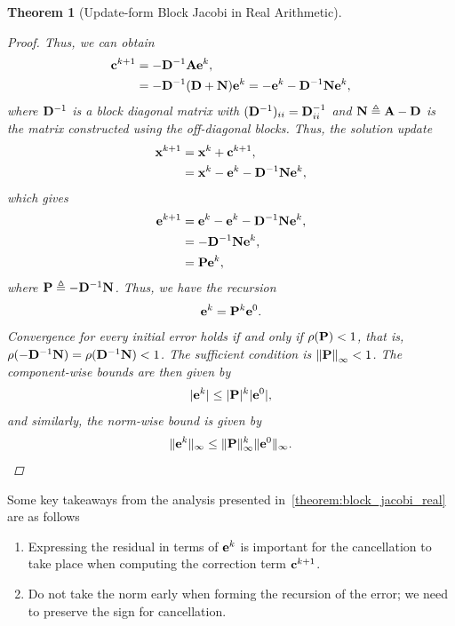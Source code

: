 \documentclass[11pt,draft]{article}
\newcommand{\define}{\ensuremath{\triangleq}}
\newcommand{\vect}[1]{\mathbf{\MakeLowercase{#1}}}
\newcommand{\mat}[1]{\mathbf{\MakeUppercase{#1}}}
\newcommand{\norm}[2][]{\left\|#2\right\|_{#1}}
\newtheorem{theorem}{Theorem}[section]
\theoremstyle{definition}
\theoremstyle{remark}
\begin{document}
\begin{theorem}[Update-form Block Jacobi in Real Arithmetic]
\begin{proof}
      Thus, we can obtain
      \begin{align}
          \vect{c}^{k+1} &= -\mat{D}^{-1}\mat{a}\vect{e}^{k},\\
          &= - \mat{D}^{-1}(\mat{d} + \mat{n})\vect{e}^{k} = - \vect{e}^k- \mat{d}^{-1}\mat{n}\vect{e}^k,
      \end{align}
      where $\mat{d}^{-1}$ is a block diagonal matrix with $(\mat{d}^{-1})_{ii} = \mat{d}_{ii}^{-1}$ and $\mat{n}\define \mat{a} - \mat{d}$ is the matrix constructed using the off-diagonal blocks.
      Thus, the solution update 
      \begin{align}
          \vect{x}^{k+1} &= \vect{x}^{k} + \vect{c}^{k+1},\\
          &= \vect{x}^k - \vect{e}^k -\mat{d}^{-1}\mat{n}\vect{e}^k,
      \end{align}
      which gives
      \begin{align}
      \vect{e}^{k+1} &= \vect{e}^k -  \vect{e}^k - \mat{d}^{-1}\mat{n}\vect{e}^k,\\
      &= -\mat{d}^{-1}\mat{n}\vect{e}^k,\\
      &= \mat{p}\vect{e}^k,
      \end{align}
      where $\mat{p}\define -\mat{d}^{-1}\mat{n}$.
      Thus, we have the recursion
      \begin{align}
          \vect{e}^{k} = \mat{p}^k \vect{e}^0.
      \end{align}
      Convergence for every initial error holds if and only if $\rho(\mat{p}) < 1$, that is, $\rho(-\mat{d}^{-1}\mat{n}) = \rho(\mat{d}^{-1}\mat{n}) < 1$.
      The sufficient condition is $\norm[\infty]{\mat{p}} < 1$.
      The component-wise bounds are then given by
      \begin{align}
          |\vect{e}^k| \leq |\mat{p}|^k |\vect{e}^0|,
      \end{align}
      and similarly, the norm-wise bound is given by 
      \begin{align}
          \|\vect{e}^k\|_\infty \leq \|\mat{p}\|_\infty^k \|\vect{e}^0\|_\infty.
      \end{align}
  \end{proof}  
\end{theorem}
Some key takeaways from the analysis presented in~\cref{theorem:block_jacobi_real} are as follows
\begin{enumerate}
    \item Expressing the residual in terms of $\vect{e}^k$ is important for the cancellation to take place when computing the correction term $\vect{c}^{k+1}$.
    \item Do not take the norm early when forming the recursion of the error; we need to preserve the sign for cancellation. 
\end{enumerate}
\end{document}
